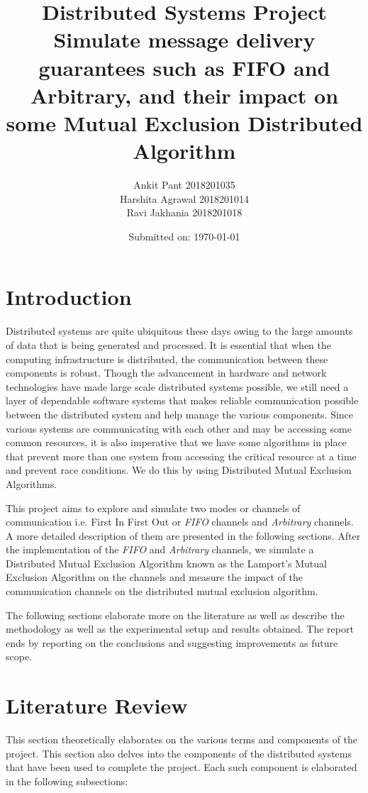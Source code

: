 \documentclass[a4paper, 12pt]{article}
\title{{\Huge Distributed Systems Project} \\ \vspace{3mm}
	{\LARGE Simulate message delivery guarantees such as FIFO and Arbitrary, and their impact on some Mutual Exclusion Distributed Algorithm }  \\ \vspace{4mm}
}
\author{Ankit Pant  2018201035 \\ 
	Harshita Agrawal 2018201014 \\
	Ravi Jakhania 2018201018 }
\date{Submitted on: \today}
\begin{document}
	\maketitle
	\thispagestyle{empty}
	\newpage
	\tableofcontents
	\newpage
	
	\setcounter{page}{1}
	\section{Introduction}
		Distributed systems are quite ubiquitous these days owing to the large amounts of data that is being generated and processed. It is essential that when the computing infrastructure is distributed, the communication between these components is robust. Though the advancement in hardware and network technologies have made large scale distributed systems possible, we still need a layer of dependable software systems that makes reliable communication possible between the distributed system and help manage the various components. Since various systems are communicating with each other and may be accessing some common resources, it is also imperative that we have some algorithms in place that prevent more than one system from accessing the critical resource at a time and prevent race conditions. We do this by using Distributed Mutual Exclusion Algorithms.
		\par This project aims to explore and simulate two modes or channels of communication i.e. First In First Out or \emph{FIFO} channels and \emph{Arbitrary} channels. A more detailed description of them are presented in the following sections. After the implementation of the \emph{FIFO} and \emph{Arbitrary} channels, we simulate a Distributed Mutual Exclusion Algorithm known as the Lamport's Mutual Exclusion Algorithm on the channels and measure the impact of the communication channels on the distributed mutual exclusion algorithm.
		\par The following sections elaborate more on the literature as well as describe the methodology as well as the experimental setup and results obtained. The report ends by reporting on the conclusions and suggesting improvements as future scope.
		
	\section{Literature Review}
		This section theoretically elaborates on the various terms and components of the project. This section also delves into the components of the distributed systems that have been used to complete the project. Each such component is elaborated in the following subsections:
		
\end{document}
